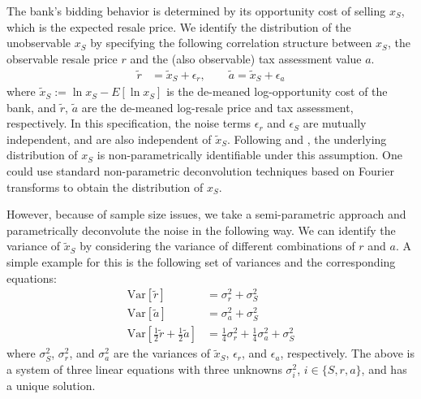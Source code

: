 \documentclass[11pt,twopage]{article}
\begin{document}
The bank's bidding behavior is determined by its opportunity cost of
selling $x_S$, which is the expected resale
price. We identify the distribution of the unobservable $x_S$ by specifying the following correlation structure between $x_S$, the observable resale price $r$ and the (also observable) tax assessment value $a$. 
%
%
%
\begin{align*}
\tilde r & = \tilde x_S   + \epsilon_r, \quad \quad \tilde a = \tilde x_S   + \epsilon_a
\end{align*}
where $\tilde x_S:=\ln x_S-E[\ln x_S]$ is the de-meaned log-opportunity
cost of the bank, and $\tilde r$, $\tilde a$ are the de-meaned
log-resale price and tax assessment, respectively. In this specification, the noise terms $\epsilon_r$ and $\epsilon_S$ are mutually independent, and are also independent of $\tilde x_S$.
%
%
Following \cite{li1998nonparametric} and \cite{krasnokutskaya2011identification}, the 
underlying distribution of $x_S$ is non-parametrically identifiable 
under this assumption. One could use standard non-parametric deconvolution
techniques based on Fourier transforms to obtain the distribution of $x_S$.

However, because of sample size issues, we take a semi-parametric approach
and parametrically deconvolute the noise in the following way.
We can identify the variance of $\tilde x_S$ by considering the
variance of different combinations of $r$ and $a$. A simple example
for this is the following set of variances and the corresponding
equations:
\begin{align*}
	\text{Var}[\tilde r] & = \sigma_r^2 + \sigma_S^2 \\
	\text{Var}[\tilde a] & = \sigma_a^2 + \sigma_S^2 \\
	\text{Var}\left[\frac{1}{2}\tilde r + \frac{1}{2}\tilde a\right] & =
	\frac{1}{4}\sigma_r^2 + \frac{1}{4}\sigma_a^2+\sigma_S^2
\end{align*}
where $\sigma_S^2$, $\sigma_r^2$, and $\sigma_a^2$ are the variances
of $\tilde x_S$, $\epsilon_r$, and $\epsilon_a$, respectively. The above is a system of three
linear equations with three unknowns $\sigma_i^2$, $i \in  \{  S,r,a \}$, and has a unique
solution.
\end{document}
